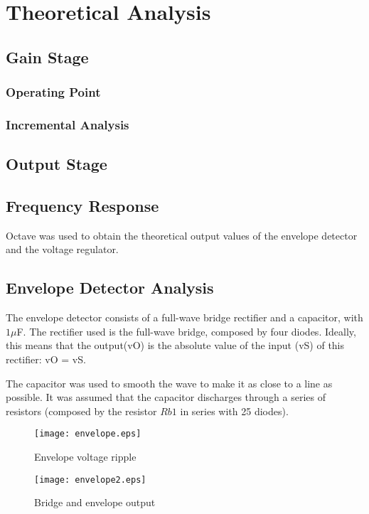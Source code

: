 \section{Theoretical Analysis} \label{sec:analysis}
\subsection{Gain Stage}
\subsubsection{Operating Point}
\subsubsection{Incremental Analysis}
\subsection{Output Stage}

\subsection{Frequency Response}









Octave was used to obtain the theoretical output values of the envelope detector and the voltage regulator. 



\subsection{Envelope Detector Analysis}

The envelope detector consists of a full-wave bridge rectifier and a capacitor, with $1\mu$F.
The rectifier used is the full-wave bridge, composed by four diodes. Ideally, this means that the output(vO) is the absolute value of the input (vS) of this rectifier: vO = \textbar vS\textbar.

The capacitor was used to smooth the wave to make it as close to a line as possible. It was assumed that the capacitor discharges through a series of resistors (composed by the resistor $Rb1$ in series with 25 diodes).

\begin{figure}[h] \centering
  \begin{minipage}{.5\textwidth}
    \texttt{[image: envelope.eps]}
    \caption{Envelope voltage ripple}
    \label{fig:simenv}
    \end{minipage}%
  \begin{minipage}{.5\textwidth}
  \centering
    \texttt{[image: envelope2.eps]}
    \caption{Bridge and envelope output}
    \label{fig:compenv}
      \end{minipage}%
\end{figure}




